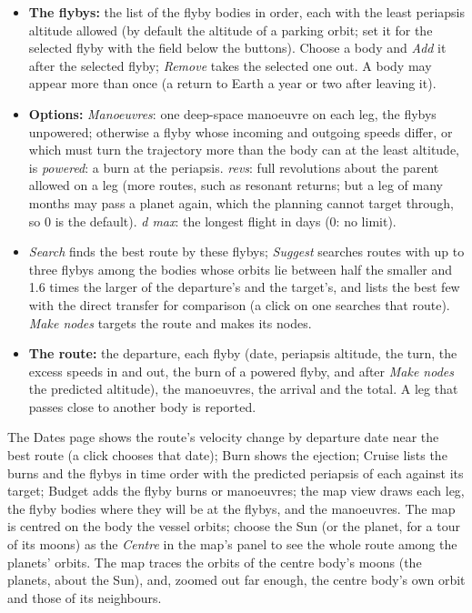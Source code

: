 \documentclass[Orbiter User Manual.tex]{subfiles}
\begin{document}
\begin{itemize}
\item \textbf{The flybys:} the list of the flyby bodies in order, each with the least periapsis altitude allowed (by default the altitude of a parking orbit; set it for the selected flyby with the field below the buttons). Choose a body and \textit{Add} it after the selected flyby; \textit{Remove} takes the selected one out. A body may appear more than once (a return to Earth a year or two after leaving it).
\item \textbf{Options:} \textit{Manoeuvres}: one deep-space manoeuvre on each leg, the flybys unpowered; otherwise a flyby whose incoming and outgoing speeds differ, or which must turn the trajectory more than the body can at the least altitude, is \textit{powered}: a burn at the periapsis. \textit{revs}: full revolutions about the parent allowed on a leg (more routes, such as resonant returns; but a leg of many months may pass a planet again, which the planning cannot target through, so 0 is the default). \textit{d max}: the longest flight in days (0: no limit).
\item \textit{Search} finds the best route by these flybys; \textit{Suggest} searches routes with up to three flybys among the bodies whose orbits lie between half the smaller and 1.6 times the larger of the departure's and the target's, and lists the best few with the direct transfer for comparison (a click on one searches that route). \textit{Make nodes} targets the route and makes its nodes.
\item \textbf{The route:} the departure, each flyby (date, periapsis altitude, the turn, the excess speeds in and out, the burn of a powered flyby, and after \textit{Make nodes} the predicted altitude), the manoeuvres, the arrival and the total. A leg that passes close to another body is reported.
\end{itemize}

\noindent
The Dates page shows the route's velocity change by departure date near the best route (a click chooses that date); Burn shows the ejection; Cruise lists the burns and the flybys in time order with the predicted periapsis of each against its target; Budget adds the flyby burns or manoeuvres; the map view draws each leg, the flyby bodies where they will be at the flybys, and the manoeuvres. The map is centred on the body the vessel orbits; choose the Sun (or the planet, for a tour of its moons) as the \textit{Centre} in the map's panel to see the whole route among the planets' orbits. The map traces the orbits of the centre body's moons (the planets, about the Sun), and, zoomed out far enough, the centre body's own orbit and those of its neighbours.
\end{document}
